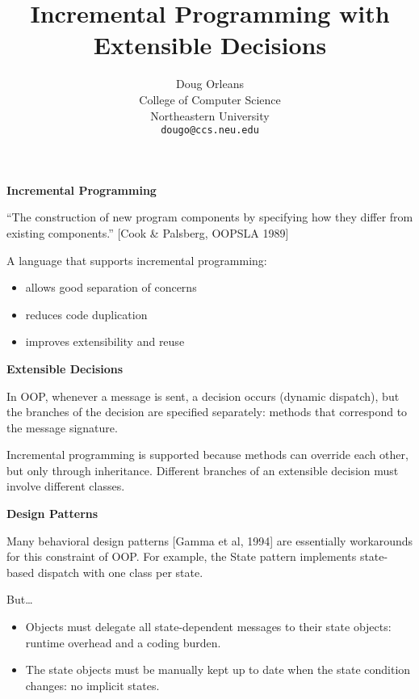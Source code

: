 \documentclass[landscape]{slides}
\title{Incremental Programming with \\ Extensible Decisions}
\author{Doug Orleans \\
College of Computer Science\\
Northeastern University \\
\texttt{dougo@ccs.neu.edu}
}
\begin{document}
\maketitle

\sloppy %

\newcommand{\defn}[1]{\textbf{#1}}
\newcommand{\code}[1]{\texttt{#1}}
\newcommand{\slidetitle}[1]{\begin{center}\textbf{#1}\end{center}}

\begin{slide}
  \slidetitle{Incremental Programming}

  ``The construction of new program components by specifying how they
  differ from existing components.'' [Cook \& Palsberg, OOPSLA 1989]

  A language that supports incremental programming:
  \begin{itemize}
    \item allows good separation of concerns
    \item reduces code duplication
    \item improves extensibility and reuse
  \end{itemize}
\end{slide}

\begin{slide}
  \slidetitle{Extensible Decisions}

  In OOP, whenever a message is sent, a decision occurs (dynamic
  dispatch), but the branches of the decision are specified
  separately: methods that correspond to the message signature.

  Incremental programming is supported because methods can override
  each other, but only through inheritance.  Different branches of an
  extensible decision must involve different classes.
\end{slide}

\begin{slide}
  \slidetitle{Design Patterns}

  Many behavioral design patterns [Gamma et al, 1994] are essentially
  workarounds for this constraint of OOP.  For example, the State
  pattern implements state-based dispatch with one class per state.

  But\ldots
  \begin{itemize}
    \item Objects must delegate all state-dependent messages to their
          state objects: runtime overhead and a coding burden.
    \item The state objects must be manually kept up to date when the
          state condition changes: no implicit states.
  \end{itemize}
\end{slide}
\end{document}
